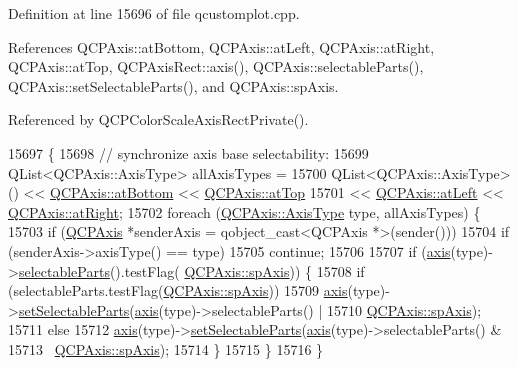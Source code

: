 Definition at line 15696 of file qcustomplot.\+cpp.



References Q\+C\+P\+Axis\+::at\+Bottom, Q\+C\+P\+Axis\+::at\+Left, Q\+C\+P\+Axis\+::at\+Right, Q\+C\+P\+Axis\+::at\+Top, Q\+C\+P\+Axis\+Rect\+::axis(), Q\+C\+P\+Axis\+::selectable\+Parts(), Q\+C\+P\+Axis\+::set\+Selectable\+Parts(), and Q\+C\+P\+Axis\+::sp\+Axis.



Referenced by Q\+C\+P\+Color\+Scale\+Axis\+Rect\+Private().


\begin{DoxyCode}
15697                                             \{
15698   \textcolor{comment}{// synchronize axis base selectability:}
15699   QList<QCPAxis::AxisType> allAxisTypes =
15700       QList<QCPAxis::AxisType>() << \hyperlink{class_q_c_p_axis_ae2bcc1728b382f10f064612b368bc18aa220d68888516b6c3b493d144f1ba438f}{QCPAxis::atBottom} << 
      \hyperlink{class_q_c_p_axis_ae2bcc1728b382f10f064612b368bc18aac0ece2b680d3f545e701f75af1655977}{QCPAxis::atTop}
15701                                  << \hyperlink{class_q_c_p_axis_ae2bcc1728b382f10f064612b368bc18aaf84aa6cac6fb6099f54a2cbf7546b730}{QCPAxis::atLeft} << 
      \hyperlink{class_q_c_p_axis_ae2bcc1728b382f10f064612b368bc18aadf5509f7d29199ef2f263b1dd224b345}{QCPAxis::atRight};
15702   \textcolor{keywordflow}{foreach} (\hyperlink{class_q_c_p_axis_ae2bcc1728b382f10f064612b368bc18a}{QCPAxis::AxisType} type, allAxisTypes) \{
15703     \textcolor{keywordflow}{if} (\hyperlink{class_q_c_p_axis}{QCPAxis} *senderAxis = qobject\_cast<QCPAxis *>(sender()))
15704       \textcolor{keywordflow}{if} (senderAxis->axisType() == type)
15705         \textcolor{keywordflow}{continue};
15706 
15707     \textcolor{keywordflow}{if} (\hyperlink{class_q_c_p_axis_rect_a560de44e47a4af0f86c59102a094b1e4}{axis}(type)->\hyperlink{class_q_c_p_axis_ad2bff3d2ed3d35c10d44c0c02441bd2c}{selectableParts}().testFlag(
      \hyperlink{class_q_c_p_axis_abee4c7a54c468b1385dfce2c898b115fa8949d2c1a31eccae9be7ed32e7a1ae38}{QCPAxis::spAxis})) \{
15708       \textcolor{keywordflow}{if} (selectableParts.testFlag(\hyperlink{class_q_c_p_axis_abee4c7a54c468b1385dfce2c898b115fa8949d2c1a31eccae9be7ed32e7a1ae38}{QCPAxis::spAxis}))
15709         \hyperlink{class_q_c_p_axis_rect_a560de44e47a4af0f86c59102a094b1e4}{axis}(type)->\hyperlink{class_q_c_p_axis_a513f9b9e326c505d9bec54880031b085}{setSelectableParts}(\hyperlink{class_q_c_p_axis_rect_a560de44e47a4af0f86c59102a094b1e4}{axis}(type)->selectableParts() |
15710                                        \hyperlink{class_q_c_p_axis_abee4c7a54c468b1385dfce2c898b115fa8949d2c1a31eccae9be7ed32e7a1ae38}{QCPAxis::spAxis});
15711       \textcolor{keywordflow}{else}
15712         \hyperlink{class_q_c_p_axis_rect_a560de44e47a4af0f86c59102a094b1e4}{axis}(type)->\hyperlink{class_q_c_p_axis_a513f9b9e326c505d9bec54880031b085}{setSelectableParts}(\hyperlink{class_q_c_p_axis_rect_a560de44e47a4af0f86c59102a094b1e4}{axis}(type)->selectableParts() &
15713                                        ~\hyperlink{class_q_c_p_axis_abee4c7a54c468b1385dfce2c898b115fa8949d2c1a31eccae9be7ed32e7a1ae38}{QCPAxis::spAxis});
15714     \}
15715   \}
15716 \}
\end{DoxyCode}


